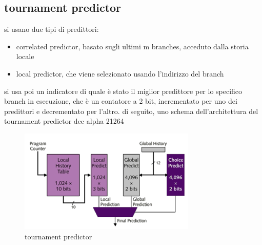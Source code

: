 \documentclass[12pt, oneside]{extbook} %
\begin{document}
\subsection{tournament predictor}
si usano due tipi di predittori:
\begin{itemize}
\item correlated predictor, basato sugli ultimi m branches, acceduto dalla storia locale
\item local predictor, che viene selezionato usando l'indirizzo del branch
\end{itemize}
si usa poi un indicatore di quale è stato il miglior predittore per lo specifico branch in esecuzione, che è un contatore a 2 bit, incrementato per uno dei predittori e decrementato per l'altro. di seguito, uno schema dell'architettura del tournament predictor dec alpha 21264\\
\begin{figure}
	\includegraphics[scale=1]{immagini/tourn_pred}
	\caption{tournament predictor}
\end{figure}
\end{document}
